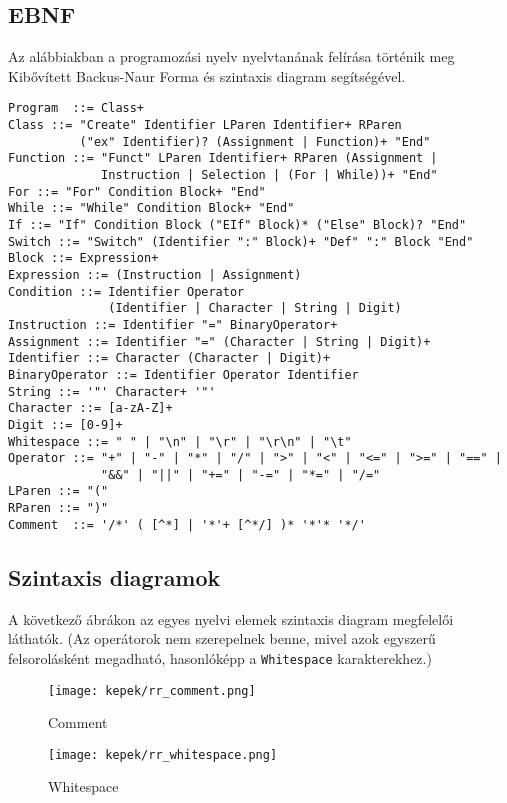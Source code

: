 \subsection{EBNF}

Az alábbiakban a programozási nyelv nyelvtanának felírása történik meg Kibővített Backus-Naur Forma és szintaxis diagram segítségével.

\begin{verbatim}
Program  ::= Class+
Class ::= "Create" Identifier LParen Identifier+ RParen
          ("ex" Identifier)? (Assignment | Function)+ "End"
Function ::= "Funct" LParen Identifier+ RParen (Assignment |
             Instruction | Selection | (For | While))+ "End"
For ::= "For" Condition Block+ "End"
While ::= "While" Condition Block+ "End"
If ::= "If" Condition Block ("EIf" Block)* ("Else" Block)? "End"
Switch ::= "Switch" (Identifier ":" Block)+ "Def" ":" Block "End"
Block ::= Expression+
Expression ::= (Instruction | Assignment)
Condition ::= Identifier Operator
              (Identifier | Character | String | Digit)
Instruction ::= Identifier "=" BinaryOperator+
Assignment ::= Identifier "=" (Character | String | Digit)+
Identifier ::= Character (Character | Digit)+
BinaryOperator ::= Identifier Operator Identifier
String ::= '"' Character+ '"'
Character ::= [a-zA-Z]+
Digit ::= [0-9]+
Whitespace ::= " " | "\n" | "\r" | "\r\n" | "\t"
Operator ::= "+" | "-" | "*" | "/" | ">" | "<" | "<=" | ">=" | "==" |
             "&&" | "||" | "+=" | "-=" | "*=" | "/="
LParen ::= "("
RParen ::= ")"
Comment  ::= '/*' ( [^*] | '*'+ [^*/] )* '*'* '*/'
\end{verbatim}

\subsection{Szintaxis diagramok}

A következő ábrákon az egyes nyelvi elemek szintaxis diagram megfelelői láthatók. (Az operátorok nem szerepelnek benne, mivel azok egyszerű felsorolásként megadható, hasonlóképp a \texttt{Whitespace} karakterekhez.)

\begin{figure}[h!]
\centering
\texttt{[image: kepek/rr\_comment.png]}
\caption{Comment}
\label{fig:rr_comment}
\end{figure}

\begin{figure}[h!]
\centering
\texttt{[image: kepek/rr\_whitespace.png]}
\caption{Whitespace}
\label{fig:rr_whitespace}
\end{figure}

